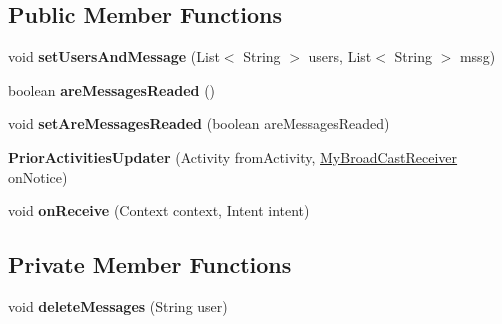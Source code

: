 \subsection*{Public Member Functions}
\begin{DoxyCompactItemize}
\item 
void {\bfseries set\+Users\+And\+Message} (List$<$ String $>$ users, List$<$ String $>$ mssg)\hypertarget{classcom_1_1example_1_1sebastian_1_1tindertp_1_1services_1_1PriorActivitiesUpdater_ac0af8e09e4f2fa665cbe71d545f66f30}{}\label{classcom_1_1example_1_1sebastian_1_1tindertp_1_1services_1_1PriorActivitiesUpdater_ac0af8e09e4f2fa665cbe71d545f66f30}

\item 
boolean {\bfseries are\+Messages\+Readed} ()\hypertarget{classcom_1_1example_1_1sebastian_1_1tindertp_1_1services_1_1PriorActivitiesUpdater_a20182e0ebc16f74679a8c2f33aaf127c}{}\label{classcom_1_1example_1_1sebastian_1_1tindertp_1_1services_1_1PriorActivitiesUpdater_a20182e0ebc16f74679a8c2f33aaf127c}

\item 
void {\bfseries set\+Are\+Messages\+Readed} (boolean are\+Messages\+Readed)\hypertarget{classcom_1_1example_1_1sebastian_1_1tindertp_1_1services_1_1PriorActivitiesUpdater_afe4c5a81f1324e4b54cfb5d619f6d572}{}\label{classcom_1_1example_1_1sebastian_1_1tindertp_1_1services_1_1PriorActivitiesUpdater_afe4c5a81f1324e4b54cfb5d619f6d572}

\item 
{\bfseries Prior\+Activities\+Updater} (Activity from\+Activity, \hyperlink{classcom_1_1example_1_1sebastian_1_1tindertp_1_1services_1_1MyBroadCastReceiver}{My\+Broad\+Cast\+Receiver} on\+Notice)\hypertarget{classcom_1_1example_1_1sebastian_1_1tindertp_1_1services_1_1PriorActivitiesUpdater_a1761a420004e2789e5db3134666d58b8}{}\label{classcom_1_1example_1_1sebastian_1_1tindertp_1_1services_1_1PriorActivitiesUpdater_a1761a420004e2789e5db3134666d58b8}

\item 
void {\bfseries on\+Receive} (Context context, Intent intent)\hypertarget{classcom_1_1example_1_1sebastian_1_1tindertp_1_1services_1_1PriorActivitiesUpdater_aa981b137b1cfde05da286a78556b006f}{}\label{classcom_1_1example_1_1sebastian_1_1tindertp_1_1services_1_1PriorActivitiesUpdater_aa981b137b1cfde05da286a78556b006f}

\end{DoxyCompactItemize}
\subsection*{Private Member Functions}
\begin{DoxyCompactItemize}
\item 
void {\bfseries delete\+Messages} (String user)\hypertarget{classcom_1_1example_1_1sebastian_1_1tindertp_1_1services_1_1PriorActivitiesUpdater_abf5ce34a32430107d2d251cd62190ef2}{}\label{classcom_1_1example_1_1sebastian_1_1tindertp_1_1services_1_1PriorActivitiesUpdater_abf5ce34a32430107d2d251cd62190ef2}

\end{DoxyCompactItemize}
